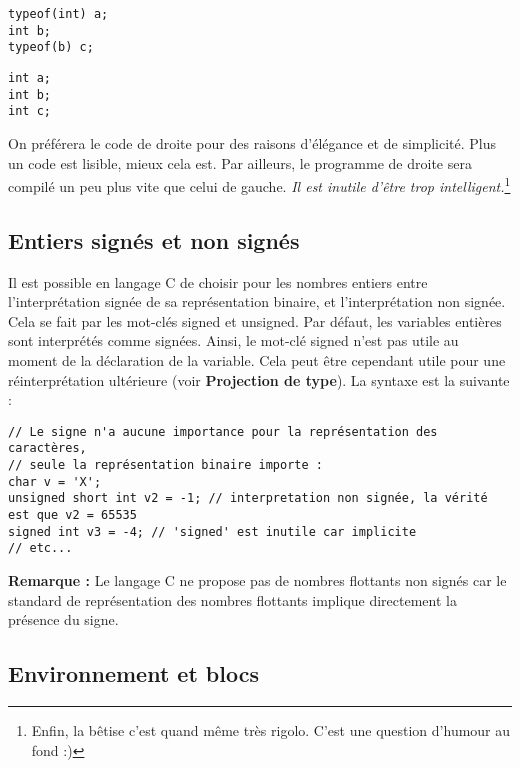 \documentclass[../../../main.tex]{subfiles}
\begin{document}
\begin{minipage}{0.5\textwidth}
\begin{verbatim}
typeof(int) a;
int b;
typeof(b) c;
\end{verbatim}
\end{minipage}
\begin{minipage}{0.5\textwidth}
\begin{verbatim}
int a;
int b;
int c;
\end{verbatim}
\end{minipage}

On préférera le code de droite pour des raisons d'élégance et de simplicité. Plus un code est lisible, mieux cela est. Par ailleurs, le programme de droite sera compilé un peu plus vite que celui de gauche. \textit{Il est inutile d'être trop intelligent.}\footnote{Enfin, la bêtise c'est quand même très rigolo. C'est une question d'humour au fond :)}
\subsection{Entiers signés et non signés}
\label{sub:entiers_sign_s_et_non_sign_s}
Il est possible en langage C de choisir pour les nombres entiers entre l'interprétation signée de sa représentation binaire, et l'interprétation non signée. Cela se fait par les mot-clés \textsf{signed} et \textsf{unsigned}. Par défaut, les variables entières sont interprétés comme signées. Ainsi, le mot-clé \textsf{signed} n'est pas utile au moment de la déclaration de la variable. Cela peut être cependant utile pour une réinterprétation ultérieure (voir \textbf{Projection de type}). La syntaxe est la suivante :
\begin{verbatim}
// Le signe n'a aucune importance pour la représentation des caractères,
// seule la représentation binaire importe :
char v = 'X';
unsigned short int v2 = -1; // interpretation non signée, la vérité est que v2 = 65535
signed int v3 = -4; // 'signed' est inutile car implicite
// etc...
\end{verbatim}
\textbf{Remarque :} Le langage C ne propose pas de nombres flottants non signés car le standard de représentation des nombres flottants implique directement la présence du signe.

\subsection{Environnement et blocs}
\label{sub:environnement_et_blocs}
\end{document}
